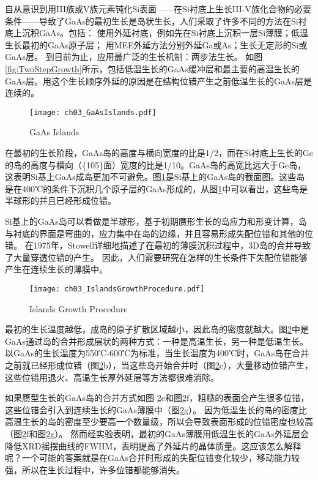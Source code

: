 自从意识到用III族或V族元素钝化Si表面——在Si衬底上生长III-V族化合物的必要条件——导致了GaAs的最初生长是岛状生长，人们采取了许多不同的方法在Si衬底上沉积GaAs。包括：
使用外延衬底，例如先在Si衬底上沉积一层Si薄膜；低温生长最初的GaAs原子层；
用MEE外延方法分别外延Ga或As；生长无定形的Si或GaAs层。
到目前为止，应用最广泛的生长机制：两步法生长。
如图\ref{fig:TwoStepGrowth}所示，包括低温生长的GaAs缓冲层和最主要的高温生长的GaAs层。用这个生长顺序外延的原因是在结构位错产生之前低温生长的GaAs层是连续的。

\begin{figure}[ht]
	\centering
	\texttt{[image: ch03\_GaAsIslands.pdf]}
	\caption{GaAs Islands}
	\label{fig:GaAsIslands}
\end{figure}

在最初的生长阶段，GaAs岛的高度与横向宽度的比是1/2，而在Si衬底上生长的Ge的岛的高度与横向（\{105\}面）宽度的比是1/10。GaAs岛的高宽比远大于Ge岛，这表明Si基上GaAs成岛更加不可避免。图\ref{fig:GaAsIslands}是Si基上的GaAs岛的截面图。这些岛是在400℃的条件下沉积几个原子层的GaAs形成的，从图\ref{fig:GaAsIslands}中可以看出，这些岛是半球形的并且已经形成位错。

Si基上的GaAs岛可以看做是半球形，基于初期赝形生长的岛应力和形变计算，岛与衬底的界面是弯曲的，应力集中在岛的边缘，并且容易形成失配位错和其他的位错。
在1975年，Stowell详细地描述了在最初的薄膜沉积过程中，3D岛的合并导致了大量穿透位错的产生。
因此，人们需要研究在怎样的生长条件下失配位错能够产生在连续生长的薄膜中。


\begin{figure}[ht]
	\centering
	\texttt{[image: ch03\_IslandsGrowthProcedure.pdf]}
	\caption{Islands Growth Procedure}
	\label{fig:IslandsGrowthProc}
\end{figure}

最初的生长温度越低，成岛的原子扩散区域越小，因此岛的密度就越大。图\ref{fig:IslandsGrowthProc}中是GaAs通过岛的合并形成层状的两种方式：一种是高温生长，另一种是低温生长。
以GaAs的生长温度为550℃-600℃为标准，当生长温度为400℃时，GaAs岛在合并之前就已经形成位错（图\ref{fig:IslandsGrowthProc}b），当这些岛开始合并时（图\ref{fig:IslandsGrowthProc}c），大量移动位错产生，这些位错用退火、高温生长厚外延层等方法都很难消除。

如果赝型生长的GaAs岛的合并方式如图 \ref{fig:IslandsGrowthProc}e和图\ref{fig:IslandsGrowthProc}f，粗糙的表面会产生很多位错，
这些位错会引入到连续生长的GaAs薄膜中（图\ref{fig:IslandsGrowthProc}g）。
因为低温生长的岛的密度比高温生长的岛的密度至少要高一个数量级，所以会导致表面形成的位错密度也较高（图\ref{fig:IslandsGrowthProc}f和图\ref{fig:IslandsGrowthProc}g）。
然而经实验表明，最初的GaAs薄膜用低温生长的GaAs外延层会降低XRD摇摆曲线的FWHM，表明提高了外延片的晶体质量。这应该怎么解释呢？一个可能的答案就是在GaAs合并时形成的失配位错变化较少，移动能力较强，所以在生长过程中，许多位错都能够消失。


